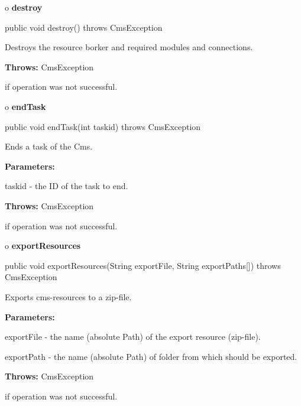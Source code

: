 o {\bf destroy} 

\begin{PRE}
 public void destroy() throws CmsException
\end{PRE}

\begin{description}
\htmlDD Destroys the resource borker and required modules and connections. 

\begin{description}
\item {\bf Throws:} CmsException  

if operation was not successful.  
\end{description}

\end{description}

o {\bf endTask} 

\begin{PRE}
 public void endTask(int taskid) throws CmsException
\end{PRE}

\begin{description}
\htmlDD Ends a task of the Cms. 

\begin{description}
\item {\bf Parameters:}  

taskid - the ID of the task to end.  
\item {\bf Throws:} CmsException  

if operation was not successful.  
\end{description}

\end{description}

o {\bf exportResources} 

\begin{PRE}
 public void exportResources(String exportFile,
                             String exportPaths[]) throws CmsException
\end{PRE}

\begin{description}
\htmlDD Exports cms-resources to a zip-file. 

\begin{description}
\item {\bf Parameters:}  

exportFile - the name (absolute Path) of the export resource (zip-file).  

exportPath - the name (absolute Path) of folder from which should be exported.
 
\item {\bf Throws:} CmsException  

if operation was not successful.  
\end{description}

\end{description}


